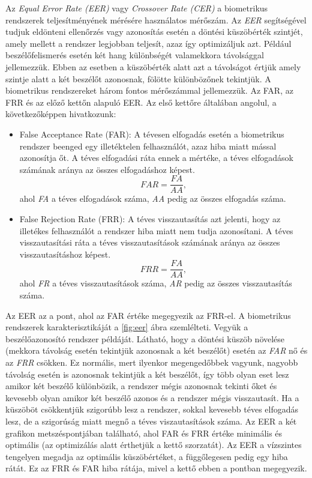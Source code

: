 Az \emph{Equal Error Rate (EER)} vagy \emph{Crossover Rate (CER)} a biometrikus rendszerek teljesítményének mérésére használatos mérőszám. Az \emph{EER} segítségével tudjuk eldönteni ellenőrzés vagy azonosítás esetén a döntési küszöbérték szintjét, amely mellett a rendszer legjobban teljesít, azaz így optimizáljuk azt. Például beszélőfelismerés esetén két hang különbségét valamekkora távolsággal jellemezzük. Ebben az esetben a küszöbérték alatt azt a távolságot értjük amely szintje alatt a két beszélőt azonosnak, fölötte különbözőnek tekintjük.
\newline
\newline
A biometrikus rendszereket három fontos mérőszámmal jellemezzük. Az FAR, az FRR és az előző kettőn alapuló EER. Az első kettőre általában angolul, a következőképpen hivatkozunk:
\begin{itemize}
	\item False Acceptance Rate (FAR): A tévesen elfogadás esetén a biometrikus rendszer beenged egy illetéktelen felhasználót, azaz hiba miatt mással azonosítja őt. A téves elfogadási ráta ennek a mértéke, a téves elfogadások számának aránya az összes elfogadáshoz képest.
	$$FAR = \frac{FA}{AA},$$
	ahol \emph{FA} a téves elfogadások száma, \emph{AA} pedig az összes elfogadás száma.
	\item False Rejection Rate (FRR): A téves visszautasítás azt jelenti, hogy az illetékes felhasználót a rendszer hiba miatt nem tudja azonosítani. A téves visszautasítási ráta a téves visszautasítások számának aránya az összes visszautasításhoz képest.
	$$FRR = \frac{FA}{AA},$$
	ahol \emph{FR} a téves visszautasítások száma, \emph{AR} pedig az összes visszautasítás száma.
\end{itemize}
Az EER az a pont, ahol az FAR értéke megegyezik az FRR-el.
\newline
\newline
A biometrikus rendszerek karakterisztikáját a \ref{fig:eer} ábra szemlélteti. Vegyük a beszélőazonosító rendszer példáját. Látható, hogy a döntési küszöb növelése (mekkora távolság esetén tekintjük azonosnak a két beszélőt) esetén az \emph{FAR} nő és az \emph{FRR} csökken. Ez normális, mert ilyenkor megengedőbbek vagyunk, nagyobb távolság esetén is azonosnak tekintjük a két beszélőt, így több olyan eset lesz amikor két beszélő különbözik, a rendszer mégis azonosnak tekinti őket és kevesebb olyan amikor két beszélő azonos és a rendszer mégis visszautasít. 
\newline
\newline
Ha a küszöböt csökkentjük szigorúbb lesz a rendszer, sokkal kevesebb téves elfogadás lesz, de a szigorúság miatt megnő a téves viszautasítások száma.
\newline
\newline
Az EER a két grafikon metszéspontjában található, ahol FAR és FRR értéke minimális és optimális (az optimizálás alatt érthetjük a kettő szorzatát). Az EER a vízszintes tengelyen megadja az optimális küszöbértéket, a függőlegesen pedig egy hiba rátát. Ez az FRR és FAR hiba rátája, mivel a kettő ebben a pontban megegyezik.

